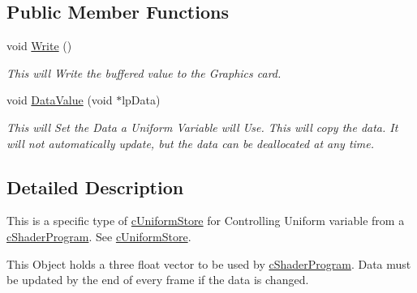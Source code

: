 \subsection*{Public Member Functions}
\begin{DoxyCompactItemize}
\item 
\hypertarget{classc_uniform_vector3_a1d01661e237db92eb300403398d2384c}{
void \hyperlink{classc_uniform_vector3_a1d01661e237db92eb300403398d2384c}{Write} ()}
\label{classc_uniform_vector3_a1d01661e237db92eb300403398d2384c}

\begin{DoxyCompactList}\small\item\em This will Write the buffered value to the Graphics card. \end{DoxyCompactList}\item 
\hypertarget{classc_uniform_vector3_abe5271750ffcfb8b16f8166dd0a5c7c1}{
void \hyperlink{classc_uniform_vector3_abe5271750ffcfb8b16f8166dd0a5c7c1}{DataValue} (void $\ast$lpData)}
\label{classc_uniform_vector3_abe5271750ffcfb8b16f8166dd0a5c7c1}

\begin{DoxyCompactList}\small\item\em This will Set the Data a Uniform Variable will Use. This will copy the data. It will not automatically update, but the data can be deallocated at any time. \end{DoxyCompactList}\end{DoxyCompactItemize}


\subsection{Detailed Description}
This is a specific type of \hyperlink{classc_uniform_store}{cUniformStore} for Controlling Uniform variable from a \hyperlink{classc_shader_program}{cShaderProgram}. See \hyperlink{classc_uniform_store}{cUniformStore}. 

This Object holds a three float vector to be used by \hyperlink{classc_shader_program}{cShaderProgram}. Data must be updated by the end of every frame if the data is changed. 